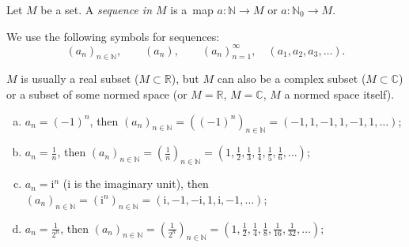 

\begin{Definition}{}
 Let $M$ be a set. A \textit{sequence in $M$} is a~map $a:\mathbb{N}\to M$
 or $a:\mathbb{N}_0 \to M$.
\end{Definition}

We use the following symbols for sequences:
\[(a_n)_{n\in\mathbb{N}},\qquad (a_n),\qquad (a_n)_{n=1}^\infty,\quad (a_1,a_2,a_3,\ldots).\]
\begin{Remark}{}
  $M$ is usually a real subset ($M\subset\mathbb{R}$), but $M$ can also be a complex subset ($M\subset\mathbb{C}$) or a subset of some normed space 
  (or $M=\mathbb{R}$, $M=\mathbb{C}$, $M$ a normed space itself).
\end{Remark}

\begin{example}{}
 \begin{enumerate}[(a)]
  \item $a_n=(-1)^n$, then $(a_n)_{n\in\mathbb{N}}=((-1)^n)_{n\in\mathbb{N}}=(-1,1,-1,1,-1,1,\ldots)$;
  \item $a_n=\frac1n$, then $(a_n)_{n\in\mathbb{N}}=(\frac1n)_{n\in\mathbb{N}}=(1,\frac12,\frac13,\frac14,\frac15,\frac16,\ldots)$;
  \item $a_n=\mathrm{i}^n$ ($\mathrm{i}$ is the imaginary unit), then $(a_n)_{n\in\mathbb{N}}=(\mathrm{i}^n)_{n\in\mathbb{N}}=(\mathrm{i},-1,-\mathrm{i},1,\mathrm{i},-1,\ldots)$;
  \item $a_n=\frac1{2^n}$, then $(a_n)_{n\in\mathbb{N}}=(\frac1{2^n})_{n\in\mathbb{N}}=(1,\frac12,\frac14,\frac18,\frac1{16},\frac1{32},\ldots)$;
\end{enumerate}
\end{example}

